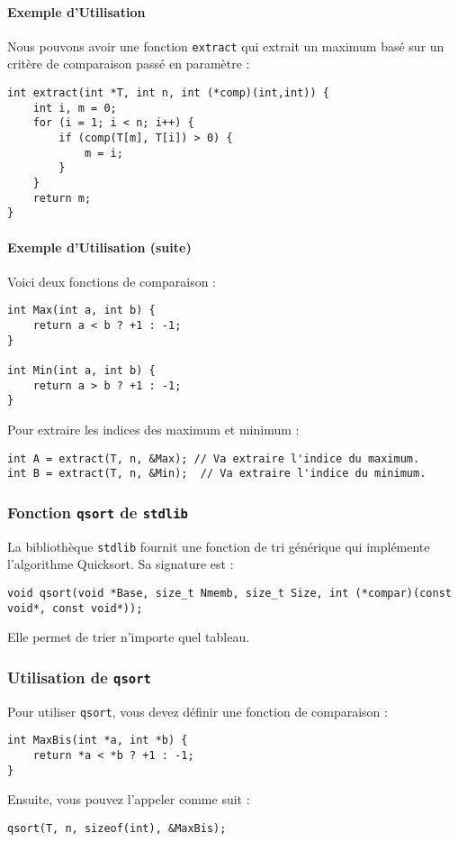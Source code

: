 \documentclass[french,11pt]{article}
\begin{document}
\paragraph{Exemple d'Utilisation}
Nous pouvons avoir une fonction \texttt{extract} qui extrait un maximum basé sur un critère de comparaison passé en paramètre :
\begin{verbatim}
int extract(int *T, int n, int (*comp)(int,int)) {
    int i, m = 0;
    for (i = 1; i < n; i++) {
        if (comp(T[m], T[i]) > 0) {
            m = i;
        }
    }
    return m;
}
\end{verbatim}

\paragraph{Exemple d'Utilisation (suite)}
Voici deux fonctions de comparaison :
\begin{verbatim}
int Max(int a, int b) {
    return a < b ? +1 : -1;
}

int Min(int a, int b) {
    return a > b ? +1 : -1;
}
\end{verbatim}

Pour extraire les indices des maximum et minimum :
\begin{verbatim}
int A = extract(T, n, &Max); // Va extraire l'indice du maximum.
int B = extract(T, n, &Min);  // Va extraire l'indice du minimum.
\end{verbatim}

\subsubsection{Fonction \texttt{qsort} de \texttt{stdlib}}
La bibliothèque \texttt{stdlib} fournit une fonction de tri générique qui implémente l'algorithme Quicksort. Sa signature est :
\begin{verbatim}
void qsort(void *Base, size_t Nmemb, size_t Size, int (*compar)(const void*, const void*));
\end{verbatim}
Elle permet de trier n'importe quel tableau.

\subsubsection{Utilisation de \texttt{qsort}}
Pour utiliser \texttt{qsort}, vous devez définir une fonction de comparaison :
\begin{verbatim}
int MaxBis(int *a, int *b) {
    return *a < *b ? +1 : -1;
}
\end{verbatim}
Ensuite, vous pouvez l'appeler comme suit :
\begin{verbatim}
qsort(T, n, sizeof(int), &MaxBis);
\end{verbatim}
\end{document}
